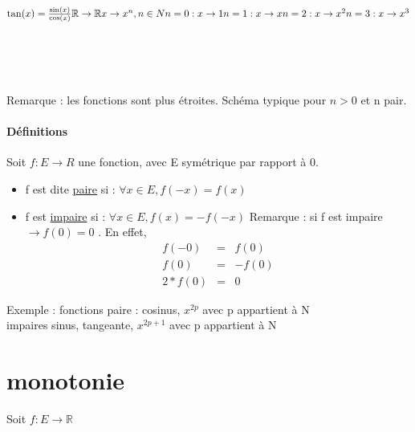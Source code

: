 \begin{math}
\tan(x) = \frac{\sin(x)}{\cos(x)}
\newline
\mathbb{R} \rightarrow \mathbb{R}
x \rightarrow x^n, n \in N
\newline
n = 0 : x \rightarrow 1
\newline
n = 1 :
x \rightarrow x
\newline
n = 2 : 
x \rightarrow x^2
\newline
n = 3 :
x \rightarrow x^3
\end{math}

~\\
~\\
~\\
Remarque : les fonctions sont plus étroites. Schéma typique pour $n >0$ et n pair.

\paragraph{Définitions} Soit $f:E \rightarrow R$ une fonction, avec E symétrique par rapport à 0.
\begin{itemize}
	\item f est dite \ul{paire} si : $\forall x \in E, f(-x) = f(x)$
	\item f est \ul{impaire} si : $\forall x \in E, f(x) = - f(-x)$ Remarque : si f est impaire $\rightarrow f(0) = 0$ . En effet, 
		\begin{eqnarray}
			f(-0) & = & f(0) \\
			f(0) & = & -f(0) \\
			2*f(0) & = & 0
		\end{eqnarray}
\end{itemize}

Exemple : fonctions paire : cosinus, $x^{2p}$ avec p appartient à N ~\\
impaires sinus, tangeante, $x^{2p+1}$ avec p appartient à N

\section{monotonie} Soit $f:E \rightarrow \mathbb{R}$

